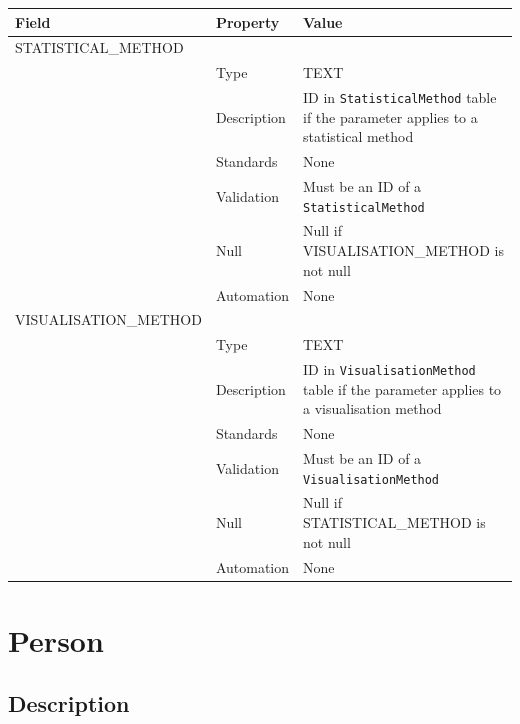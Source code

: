 \documentclass[
]{article}
\newcounter{none} %
\begin{document}
{\def\LTcaptype{none} %
\begin{longtable}[]{@{}
  >{\raggedright\arraybackslash}p{}
  >{\raggedright\arraybackslash}p{}
  >{\raggedright\arraybackslash}p{}@{}}
\toprule\noalign{}
\begin{minipage}[b]{\linewidth}\raggedright
Field
\end{minipage} & \begin{minipage}[b]{\linewidth}\raggedright
Property
\end{minipage} & \begin{minipage}[b]{\linewidth}\raggedright
Value
\end{minipage} \\
\midrule\noalign{}
\endhead
\bottomrule\noalign{}
\endlastfoot
STATISTICAL\_METHOD & & \\
& Type & TEXT \\
& Description & ID in \texttt{StatisticalMethod} table if the parameter
applies to a statistical method \\
& Standards & None \\
& Validation & Must be an ID of a \texttt{StatisticalMethod} \\
& Null & Null if VISUALISATION\_METHOD is not null \\
& Automation & None \\
VISUALISATION\_METHOD & & \\
& Type & TEXT \\
& Description & ID in \texttt{VisualisationMethod} table if the
parameter applies to a visualisation method \\
& Standards & None \\
& Validation & Must be an ID of a \texttt{VisualisationMethod} \\
& Null & Null if STATISTICAL\_METHOD is not null \\
& Automation & None \\
\end{longtable}
}

\section{Person}\label{person}

\subsection{Description}\label{description-20}
\end{document}
